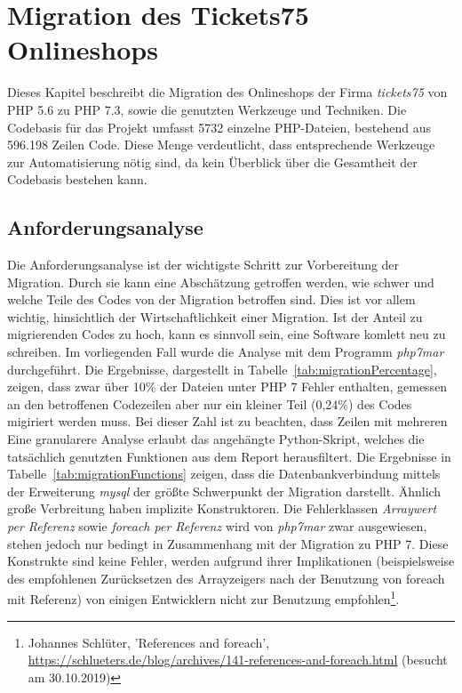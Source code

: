 \chapter{Migration des Tickets75 Onlineshops}\label{ch:migration} 

Dieses Kapitel beschreibt die Migration des Onlineshops der Firma \textit{tickets75} von \ac{PHP} 5.6 zu \ac{PHP} 7.3, sowie die 
genutzten Werkzeuge und Techniken. Die Codebasis 
für das Projekt umfasst 5732 einzelne \ac{PHP}-Dateien, bestehend aus 596.198 Zeilen Code. Diese Menge verdeutlicht, dass 
entsprechende Werkzeuge zur Automatisierung nötig sind, da kein Überblick über die Gesamtheit der Codebasis bestehen kann.

\section{Anforderungsanalyse}\label{analyze}
Die Anforderungsanalyse ist der wichtigste Schritt zur Vorbereitung der Migration. Durch sie kann eine Abschätzung getroffen werden, 
wie schwer und welche Teile des Codes von der Migration betroffen sind. Dies ist vor allem wichtig, hinsichtlich der 
Wirtschaftlichkeit einer Migration. Ist der Anteil zu migrierenden Codes zu hoch, kann es sinnvoll sein, eine Software 
komlett neu zu schreiben. Im vorliegenden Fall wurde die Analyse mit dem Programm \textit{php7mar} durchgeführt.
Die Ergebnisse, dargestellt in Tabelle~\ref{tab:migrationPercentage}, zeigen, dass zwar über 10\% der Dateien unter \ac{PHP} 7 
Fehler enthalten, gemessen an den betroffenen Codezeilen aber nur ein kleiner Teil (0,24\%) des Codes migiriert werden muss.
Bei dieser Zahl ist zu beachten, dass Zeilen mit mehreren 
Eine granularere Analyse erlaubt das angehängte Python-Skript, welches die tatsächlich genutzten Funktionen aus dem Report 
herausfiltert. Die Ergebnisse in Tabelle~\ref{tab:migrationFunctions} zeigen, dass die Datenbankverbindung mittels der 
Erweiterung \textit{mysql} der größte Schwerpunkt der Migration darstellt. Ähnlich große Verbreitung haben implizite 
Konstruktoren. Die Fehlerklassen \textit{Arraywert per Referenz} sowie \textit{foreach per Referenz} wird von \textit{php7mar} zwar ausgewiesen, stehen jedoch 
nur bedingt in Zusammenhang mit der Migration zu \ac{PHP} 7. Diese Konstrukte sind keine Fehler, werden aufgrund ihrer Implikationen (beispielsweise des empfohlenen 
Zurücksetzen des Arrayzeigers nach der Benutzung von foreach mit Referenz) von einigen Entwicklern nicht zur Benutzung empfohlen\footnote{Johannes Schlüter, 'References and foreach', \url{https://schlueters.de/blog/archives/141-references-and-foreach.html} (besucht am 30.10.2019)}.
